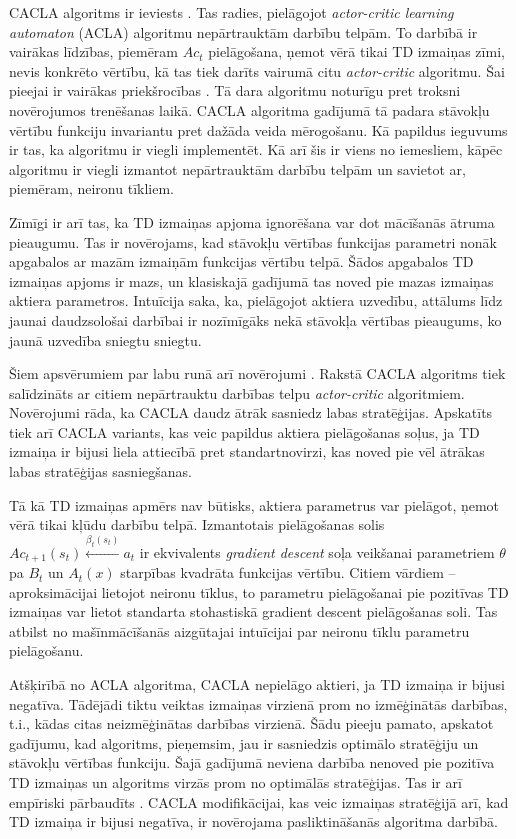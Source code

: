 \documentclass{ludis} %
\begin{document}
CACLA algoritms ir ieviests \autocite{Hasselt2007}. Tas radies, pielāgojot
\textit{actor-critic learning automaton} (ACLA) algoritmu nepārtrauktām darbību
telpām. To darbībā ir vairākas līdzības, piemēram $Ac_t$ pielāgošana, ņemot vērā
tikai TD izmaiņas zīmi, nevis konkrēto vērtību, kā tas tiek darīts vairumā citu
\textit{actor-critic} algoritmu. Šai pieejai ir vairākas priekšrocības
\autocite{Hasselt2007}. Tā dara algoritmu noturīgu pret troksni novērojumos
trenēšanas laikā. CACLA algoritma gadījumā tā padara stāvokļu vērtību funkciju
invariantu pret dažāda veida mērogošanu. Kā papildus ieguvums ir tas, ka
algoritmu ir viegli implementēt. Kā arī šis ir viens no iemesliem, kāpēc
algoritmu ir viegli izmantot nepārtrauktām darbību telpām un savietot ar,
piemēram, neironu tīkliem.

Zīmīgi ir arī tas, ka TD izmaiņas apjoma ignorēšana var dot mācīšanās ātruma
pieaugumu. Tas ir novērojams, kad stāvokļu vērtības funkcijas parametri nonāk
apgabalos ar mazām izmaiņām funkcijas vērtību telpā. Šādos apgabalos TD izmaiņas
apjoms ir mazs, un klasiskajā gadījumā tas noved pie mazas izmaiņas aktiera
parametros. Intuīcija saka, ka, pielāgojot aktiera uzvedību, attālums līdz jaunai
daudzsološai darbībai ir nozīmīgāks nekā stāvokļa vērtības pieaugums, ko jaunā
uzvedība sniegtu sniegtu.

Šiem apsvērumiem par labu runā arī novērojumi \autocite{Hasselt2007}. Rakstā
CACLA algoritms tiek salīdzināts ar citiem nepārtrauktu darbības telpu
\textit{actor-critic} algoritmiem. Novērojumi rāda, ka CACLA daudz ātrāk
sasniedz labas stratēģijas. Apskatīts tiek arī CACLA variants, kas veic papildus
aktiera pielāgošanas soļus, ja TD izmaiņa ir bijusi liela attiecībā pret
standartnovirzi, kas noved pie vēl ātrākas labas stratēģijas sasniegšanas.

Tā kā TD izmaiņas apmērs nav būtisks, aktiera parametrus var pielāgot, ņemot
vērā tikai kļūdu darbību telpā. Izmantotais pielāgošanas solis $Ac_{t+1}(s_t)
\xleftarrow{\beta_t(s_t)} a_t$ ir ekvivalents \textit{gradient descent} soļa
veikšanai parametriem $\theta$ pa $B_t$ un $A_t(x)$ starpības kvadrāta funkcijas
vērtību. Citiem vārdiem -- aproksimācijai lietojot neironu tīklus, to parametru
pielāgošanai pie pozitīvas TD izmaiņas var lietot standarta stohastiskā
{gradient descent} pielāgošanas soli. Tas atbilst no mašīnmācīšanās aizgūtajai
intuīcijai par neironu tīklu parametru pielāgošanu.

Atšķirībā no ACLA algoritma, CACLA nepielāgo aktieri, ja TD izmaiņa ir bijusi
negatīva. Tādējādi tiktu veiktas izmaiņas virzienā prom no izmēģinātās darbības,
t.i., kādas citas neizmēģinātas darbības virzienā. Šādu pieeju pamato, apskatot
gadījumu, kad algoritms, pieņemsim, jau ir sasniedzis optimālo stratēģiju un
stāvokļu vērtības funkciju. Šajā gadījumā neviena darbība nenoved pie pozitīva
TD izmaiņas un algoritms virzās prom no optimālās stratēģijas. Tas ir arī
empīriski pārbaudīts \autocite{Hasselt2007}. CACLA modifikācijai, kas veic
izmaiņas stratēģijā arī, kad TD izmaiņa ir bijusi negatīva, ir novērojama
pasliktināšanās algoritma darbībā.
\end{document}
